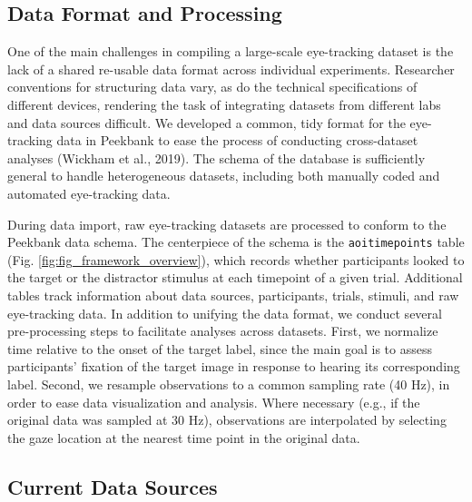\documentclass[10pt, letterpaper]{article}
\begin{document}
\hypertarget{data-format-and-processing}{%
\subsection{Data Format and
Processing}\label{data-format-and-processing}}

One of the main challenges in compiling a large-scale eye-tracking
dataset is the lack of a shared re-usable data format across individual
experiments. Researcher conventions for structuring data vary, as do the
technical specifications of different devices, rendering the task of
integrating datasets from different labs and data sources difficult. We
developed a common, tidy format for the eye-tracking data in Peekbank to
ease the process of conducting cross-dataset analyses (Wickham et al.,
2019). The schema of the database is sufficiently general to handle
heterogeneous datasets, including both manually coded and automated
eye-tracking data.

During data import, raw eye-tracking datasets are processed to conform
to the Peekbank data schema. The centerpiece of the schema is the
\texttt{aoi\textunderscore timepoints} table (Fig.
\ref{fig:fig_framework_overview}), which records whether participants
looked to the target or the distractor stimulus at each timepoint of a
given trial. Additional tables track information about data sources,
participants, trials, stimuli, and raw eye-tracking data. In addition to
unifying the data format, we conduct several pre-processing steps to
facilitate analyses across datasets. First, we normalize time relative
to the onset of the target label, since the main goal is to assess
participants' fixation of the target image in response to hearing its
corresponding label. Second, we resample observations to a common
sampling rate (40 Hz), in order to ease data visualization and analysis.
Where necessary (e.g., if the original data was sampled at 30 Hz),
observations are interpolated by selecting the gaze location at the
nearest time point in the original data.

\hypertarget{current-data-sources}{%
\subsection{Current Data Sources}\label{current-data-sources}}
\end{document}
